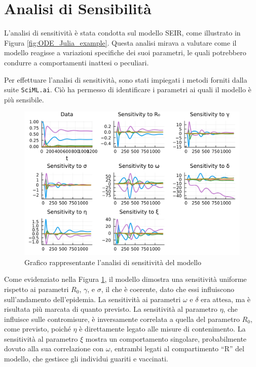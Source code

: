 \section{Analisi di Sensibilità}

L'analisi di sensitività è stata condotta sul modello SEIR, 
come illustrato in Figura \ref{fig:ODE_Julia_example}. 
Questa analisi mirava a valutare come il modello reagisse a 
variazioni specifiche dei suoi parametri, le quali potrebbero 
condurre a comportamenti inattesi o peculiari.

Per effettuare l'analisi di sensitività, sono stati impiegati i 
metodi forniti dalla suite \texttt{SciML.ai}. Ciò ha permesso di identificare 
i parametri ai quali il modello è più sensibile.

\begin{figure}[H]
    \begin{center}
		\includegraphics[width=\textwidth]{img/sa.jpg}
		\caption{Grafico rappresentante l'analisi di sensitività del modello}
		\label{fig:sens_anal}
	\end{center}
\end{figure}

Come evidenziato nella Figura \ref{fig:sens_anal}, il modello 
dimostra una sensitività uniforme rispetto ai parametri 
$R_0$, $\gamma$, e $\sigma$, il che è coerente, dato che essi 
influiscono sull'andamento dell'epidemia. La sensitività ai parametri 
$\omega$ e $\delta$ era attesa, ma è risultata più marcata di 
quanto previsto. La sensitività al parametro $\eta$, che influisce 
sulle contromisure, è inversamente correlata a quella del 
parametro $R_0$, come previsto, poiché $\eta$ è direttamente 
legato alle misure di contenimento. La sensitività al parametro 
$\xi$ mostra un comportamento singolare, probabilmente dovuto 
alla sua correlazione con $\omega$, entrambi legati al compartimento 
``R'' del modello, che gestisce gli individui guariti e vaccinati.


